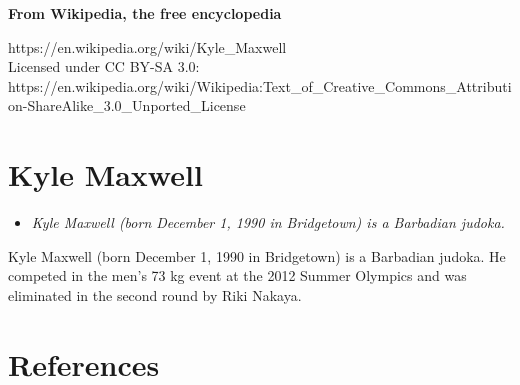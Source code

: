 \textbf{From Wikipedia, the free encyclopedia}

https://en.wikipedia.org/wiki/Kyle\_Maxwell\\
Licensed under CC BY-SA 3.0:\\
https://en.wikipedia.org/wiki/Wikipedia:Text\_of\_Creative\_Commons\_Attribution-ShareAlike\_3.0\_Unported\_License

\section{Kyle Maxwell}\label{kyle-maxwell}

\begin{itemize}
\item
  \emph{Kyle Maxwell (born December 1, 1990 in Bridgetown) is a
  Barbadian judoka.}
\end{itemize}

Kyle Maxwell (born December 1, 1990 in Bridgetown) is a Barbadian
judoka. He competed in the men's 73 kg event at the 2012 Summer Olympics
and was eliminated in the second round by Riki Nakaya.

\section{References}\label{references}
